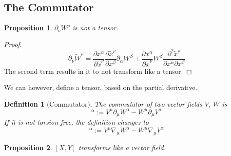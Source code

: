 \documentclass[a4paper]{article}
\theoremstyle{new}
\newtheorem{defi}{Definition}[section]
\newtheorem{prop}{Proposition}[section]
\begin{document}
\subsection{The Commutator}
\begin{prop}
$\partial_\nu W^\rho$ is not a tensor.
\end{prop}
\begin{proof}
\begin{equation}
\tilde{\partial}_\nu\tilde{W}^\rho=\frac{\partial x^\alpha}{\partial\tilde{x}^\nu}\frac{\partial\tilde{x}^\rho}{\partial x^\beta}\partial_\alpha W^\beta+\frac{\partial x^\alpha}{\partial\tilde{x}^\nu}W^\beta\frac{\partial^2\tilde{x}^\rho}{\partial x^\alpha\partial x^\beta}\label{derivvector}
\end{equation}
The second term results in it to not transform like a tensor.
\end{proof}
We can however, define a tensor, based on the partial derivative.
\begin{defi}[Commutator]
The commutator of two vector fields $V$, $W$ is
\begin{equation}
[V,W]^\alpha:=V^\mu\partial_\mu W^\alpha -W^\mu\partial_\mu V^\alpha\label{commutator1}
\end{equation}
If it is not torsion free, the definition changes to
\begin{equation}
[V,W]^\alpha:=V^\mu\nabla_\mu W^\alpha -W^\mu\nabla_\mu V^\alpha\label{commutator2}
\end{equation}
\end{defi}
\begin{prop}
$[X,Y]$ transforms like a vector field.
\end{prop}
\end{document}
